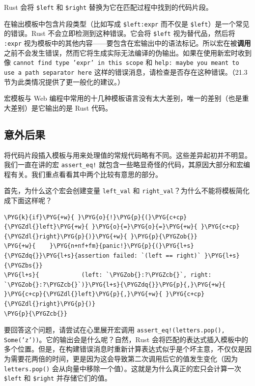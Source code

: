 Rust 会将 \texttt{\$left} 和 \texttt{\$right} 替换为它在匹配过程中找到的代码片段。

在输出模板中包含片段类型（比如写成 \texttt{\$left:expr} 而不仅是 \texttt{\$left}）是一个常见的错误。Rust 不会立即检测到这种错误。它会将 \texttt{\$left} 视为替代品，然后将 \texttt{:expr} 视为模板中的其他内容——要包含在宏输出中的语法标记。所以宏在被\textbf{调用}之前不会发生错误，然而它将生成实际无法编译的伪输出。如果在使用新宏时收到像 \texttt{cannot find type 'expr' in this scope} 和 \texttt{help: maybe you meant to use a path separator here} 这样的错误消息，请检查是否存在这种错误。（21.3 节为此类情况提供了更一般化的建议。）

宏模板与 Web 编程中常用的十几种模板语言没有太大差别，唯一的差别（也是重大差别）是它输出的是 Rust 代码。

\subsection{意外后果}

将代码片段插入模板与用来处理值的常规代码略有不同。这些差异起初并不明显。我们一直在讲的宏 \texttt{assert\_eq!} 就包含一些略显奇怪的代码，其原因大部分和宏编程有关。我们重点看看其中两个比较有意思的部分。

首先，为什么这个宏会创建变量 \texttt{left\_val} 和 \texttt{right\_val}？为什么不能将模板简化成下面这样呢？

\begin{Verbatim}[commandchars=\\\{\},breaklines=true,breakanywhere=true,fontsize=\codefont,xleftmargin=17bp]
\PYG{k}{if}\PYG{+w}{ }\PYG{o}{!}\PYG{p}{(}\PYG{c+cp}{\PYGZdl{}left}\PYG{+w}{ }\PYG{o}{=}\PYG{o}{=}\PYG{+w}{ }\PYG{c+cp}{\PYGZdl{}right}\PYG{p}{)}\PYG{+w}{ }\PYG{p}{\PYGZob{}}
\PYG{+w}{    }\PYG{n+nf+fm}{panic!}\PYG{p}{(}\PYG{l+s}{\PYGZdq{}}\PYG{l+s}{assertion failed: `(left == right)` }\PYG{l+s}{\PYGZbs{}}
\PYG{l+s}{            (left: `\PYGZob{}:?\PYGZcb{}`, right: `\PYGZob{}:?\PYGZcb{}`)}\PYG{l+s}{\PYGZdq{}}\PYG{p}{,}\PYG{+w}{ }\PYG{c+cp}{\PYGZdl{}left}\PYG{p}{,}\PYG{+w}{ }\PYG{c+cp}{\PYGZdl{}right}\PYG{p}{)}
\PYG{p}{\PYGZcb{}}
\end{Verbatim}

要回答这个问题，请尝试在心里展开宏调用 \texttt{assert\_eq!(letters.pop(), Some('z'))}。它的输出会是什么呢？自然，Rust 会将匹配的表达式插入模板中的多个位置。但是，在构建错误消息时重新计算表达式似乎是个坏主意，不仅仅是因为需要花两倍的时间，更是因为这会导致第二次调用后它的值发生变化（因为 \texttt{letters.pop()} 会从向量中移除一个值）。这就是为什么真正的宏只会计算一次 \texttt{\$left} 和 \texttt{\$right} 并存储它们的值。

